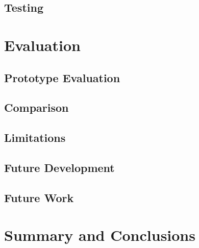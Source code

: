 \section{Testing}


\chapter{Evaluation}
\section{Prototype Evaluation}
\section{Comparison}
\section{Limitations}
\section{Future Development}
\section{Future Work}
\newpage

\chapter{Summary and Conclusions}
